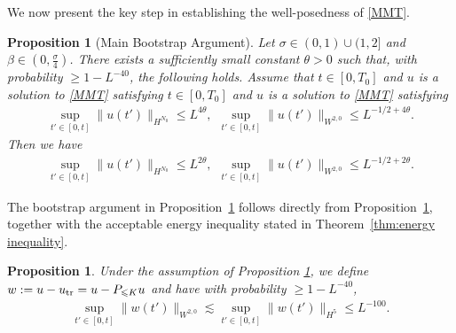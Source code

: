 \documentclass[UTF-8,reqno]{amsart}
\numberwithin{equation}{section}
\newtheorem{proposition}[theorem]{Proposition}
\theoremstyle{definition}
\def\geq{\geqslant}
\def\leq{\leqslant}
\def\geq{\geqslant}
\def\leq{\leqslant}
\begin{document}
We now present the key step in establishing the well-posedness of \eqref{MMT}.

\begin{proposition}[Main Bootstrap Argument]\label{prop:bootstrap}
Let $\sigma\in(0,1)\cup (1,2]$ and $\beta\in(0,\frac{\sigma}{4})$. 
There exists a sufficiently small constant $\theta>0$ such that, with probability $\geq 1-L^{-40}$, the following holds.
 Assume that $t \in [0,T_0]$ and $u$ is a solution to \eqref{MMT} satisfying
 $t \in [0,T_0]$ and $u$ is a solution to \eqref{MMT} satisfying
\begin{align*}
   \sup_{t'\in[0,t]} \|u(t')\|_{H^{N_0}}\leq L^{4\theta},\ \ \sup_{t'\in[0,t]} \|u(t')\|_{W^{2,0}}\leq L^{-1/2+4\theta}.
\end{align*}
Then we have 
\begin{align}
   \sup_{t'\in[0,t]} \|u(t')\|_{H^{N_0}}\leq L^{2\theta},\ \ \sup_{t'\in[0,t]} \|u(t')\|_{W^{2,0}}\leq L^{-1/2+2\theta}.\label{bd:bootstrap}
\end{align}
\end{proposition}

The bootstrap argument in Proposition~\ref{prop:bootstrap} follows directly from Proposition~\ref{prop:wh5d}, together with the acceptable energy inequality stated in Theorem~\ref{thm:energy inequality}.

\begin{proposition} \label{prop:wh5d}
   Under the assumption of Proposition \ref{prop:bootstrap}, we define $w:=u-u_{\rm tr}=u-P_{\leq K} u$ and have  with probability $\geq 1-L^{-40}$,
\begin{align*}
   \sup_{t'\in[0,t]} \|w(t')\|_{W^{2,0}}\lesssim   \sup_{t'\in[0,t]} \|w(t')\|_{H^{5}}\leq L^{-100}.
\end{align*}
\end{proposition}
\end{document}
